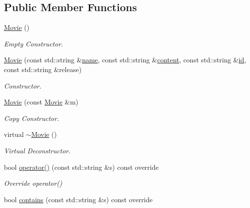 \subsection*{Public Member Functions}
\begin{DoxyCompactItemize}
\item 
\hyperlink{class_movie_a62d82e9e61d6349ae66a73d0af6667ac}{Movie} ()
\begin{DoxyCompactList}\small\item\em Empty Constructor. \end{DoxyCompactList}\item 
\hyperlink{class_movie_a17b379568b67f19feb4629a45e837614}{Movie} (const std\+::string \&\hyperlink{class_index_item_a059cbae312c51ae7d02050f8f325bf93}{name}, const std\+::string \&\hyperlink{class_index_item_a2b5b4451bcb2fd50328bdc5b470d6296}{content}, const std\+::string \&\hyperlink{class_movie_a8c874927c4c49945d810a39938f64115}{id}, const std\+::string \&release)
\begin{DoxyCompactList}\small\item\em Constructor. \end{DoxyCompactList}\item 
\mbox{\label{class_movie_afd914bae3adea2d57aa6ffcba5ad42b0}} 
\hyperlink{class_movie_afd914bae3adea2d57aa6ffcba5ad42b0}{Movie} (const \hyperlink{class_movie}{Movie} \&m)
\begin{DoxyCompactList}\small\item\em Copy Constructor. \end{DoxyCompactList}\item 
\mbox{\label{class_movie_abb2861f5e0f380ca942f68c05833ffe8}} 
virtual \hyperlink{class_movie_abb2861f5e0f380ca942f68c05833ffe8}{$\sim$\+Movie} ()
\begin{DoxyCompactList}\small\item\em Virtual Deconstructor. \end{DoxyCompactList}\item 
bool \hyperlink{class_movie_a2ccd49265baa8fe6c51f8f4953f20bca}{operator()} (const std\+::string \&s) const override
\begin{DoxyCompactList}\small\item\em Override operator() \end{DoxyCompactList}\item 
bool \hyperlink{class_movie_ad6ee4833582077b9a6543ba574343005}{contains} (const std\+::string \&s) const override

\end{DoxyCompactItemize}
